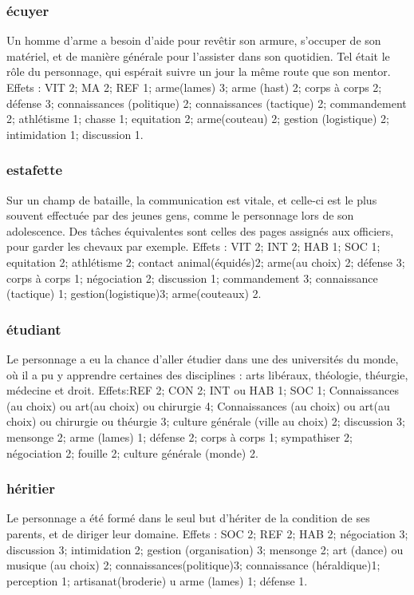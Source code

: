 \documentclass[10pt,a4paper,twocolumn]{book}
\begin{document}
\subsubsection{écuyer}
Un homme d’arme a besoin d’aide pour revêtir son armure, s’occuper de son matériel, et de manière générale pour l’assister dans son quotidien. Tel était le rôle du personnage, qui espérait suivre un jour la même route que son mentor.
Effets : VIT 2; MA 2; REF 1; arme(lames) 3; arme (hast) 2; corps à corps 2; défense 3; connaissances (politique) 2; connaissances (tactique) 2; commandement 2; athlétisme 1; chasse 1; equitation 2; arme(couteau) 2; gestion (logistique) 2; intimidation 1; discussion 1.
\subsubsection{estafette}
Sur un champ de bataille, la communication est vitale, et celle-ci est le plus souvent effectuée par des jeunes gens, comme le personnage lors de son adolescence. Des tâches équivalentes sont celles des pages assignés aux officiers, pour garder les chevaux par exemple.
Effets : VIT 2; INT 2; HAB 1; SOC 1; equitation 2; athlétisme 2; contact animal(équidés)2; arme(au choix) 2; défense 3; corps à corps 1; négociation 2; discussion 1; commandement 3; connaissance (tactique) 1; gestion(logistique)3; arme(couteaux) 2.
\subsubsection{étudiant}
Le personnage a eu la chance d’aller étudier dans une des universités du monde, où il a pu y apprendre certaines des disciplines : arts libéraux, théologie, théurgie, médecine et droit.
Effets:REF 2; CON 2; INT ou HAB 1; SOC 1; Connaissances (au choix) ou art(au choix) ou chirurgie 4; Connaissances (au choix) ou art(au choix) ou chirurgie ou théurgie 3; culture générale (ville au choix) 2; discussion 3; mensonge 2; arme (lames) 1; défense 2; corps à corps 1; sympathiser 2; négociation 2; fouille 2; culture générale (monde) 2.
\subsubsection{héritier}
Le personnage a été formé dans le seul but d’hériter de la condition de ses parents, et de diriger leur domaine.
Effets : SOC 2; REF 2; HAB 2; négociation 3; discussion 3; intimidation 2; gestion (organisation) 3; mensonge 2; art (dance) ou musique (au choix) 2; connaissances(politique)3; connaissance (héraldique)1; perception 1; artisanat(broderie) u arme (lames) 1; défense 1.
\end{document}
